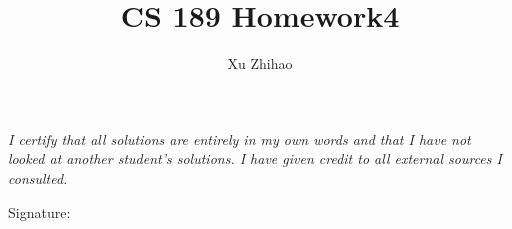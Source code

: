 \documentclass[a4paper,12pt]{article}
\title{CS 189 Homework4}
\author{Xu Zhihao}
\begin{document}
\pagestyle{fancy}{}
\fancyhf{} 
\rhead{\thepage \  / \pageref{LastPage}}

\maketitle

\emph{I certify that all solutions are entirely in my own words and that I have not looked at another student’s solutions. I have given credit to all external sources I consulted.} 
\begin{flushright}
Signature: \quad \quad \quad \quad \quad \quad \quad \quad \quad \quad \quad
\end{flushright}
\vspace{100pt}

\tableofcontents

\clearpage
\end{document}
